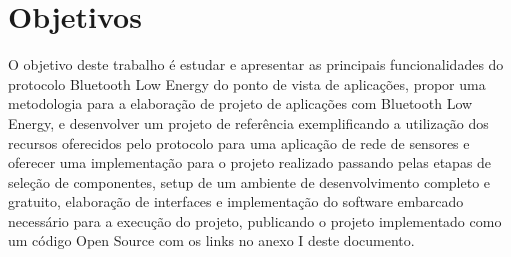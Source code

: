 \section{Objetivos}

O objetivo deste trabalho é estudar e apresentar as principais funcionalidades
do protocolo Bluetooth Low Energy do ponto de vista de aplicações,
propor uma metodologia para a elaboração de projeto de aplicações com
Bluetooth Low Energy, e desenvolver um projeto de referência exemplificando a
utilização dos recursos oferecidos pelo protocolo para uma aplicação de rede de
sensores e oferecer uma implementação para o projeto realizado passando pelas
etapas de seleção de componentes, setup de um ambiente de desenvolvimento
completo e gratuito, elaboração de interfaces e implementação do software
embarcado necessário para a execução do projeto, publicando o projeto
implementado como um código Open Source com os links no anexo I deste documento.
